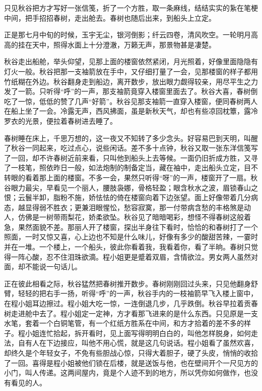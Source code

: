\documentclass[12pt,UTF8]{ctexbook}
\begin{document}
{{{只见秋谷把方才写好一张信笺，折了一个方胜，取一条麻线，结结实实的紥在笔梗中间，把手招招春树，走出舱去。春树也随后出来，到船头上立定。

正是那七月中旬的时候，玉宇无尘，银河倒影；纤云四卷，清风吹空。一轮明月高高的挂在天中，照得水面上十分澄澈，万籁无声，那景物甚是凄楚。

秋谷走出船舱，举头仰望，见那上面的楼窗依然紧闭，月光照着，好像里面隐隐有灯火一般。秋谷把那一支袖箭放在手中，又仔细打量了一会，见那楼窗的样子都用竹纸糊在外边。秋谷翻身走到船边，离开数步，放出眼力觑得较亲，用尽平生之力发了一箭。只听得“呼”的一声，那支袖箭竟穿入楼窗里面去了。秋谷大喜，春树倒吃了一惊，低低的赞了几声“好箭”。秋谷见那支袖箭一直穿入楼窗，便同春树两人在船上坐了一会。冷露无声，西风拂面，虽是新秋天气，却也有些凉回枕簟，露冷罗衣的光景，便拉着春树进去睡了。

春树睡在床上，千思万想的，这一夜又不知转了多少念头。好容易巴到天明，叫醒了秋谷一同起来，吃过点心，说些闲话。差不多十点钟，秋谷又取一张东洋信笺写了一回，却不许春树近前来看，只叫他到船头上去等候。一面仍旧折成方胜，又寻了一枝笔，照依昨日一般，如法炮制的制备定当，藏在袖中，走出船头立定，目不转眼的看着那上面的楼窗。不多一会，果然只听得“呀”的一声，楼窗开了一扇。秋谷眼力最尖，早看见一个丽人，腰肢袅娜，骨格轻盈；眼含秋水之波，眉锁春山之恨；云鬟半卸，脂粉不施，娇怯怯的倚在楼窗向着下边张望。面上好像带着几分病态，越显得弱不胜衣；更兼泪眼惺忪，愁容寂寞，那一付带病含愁的丰格煞是动人，仿佛是一树带雨梨花，娇柔欲坠。秋谷见了暗暗喝彩，想怪不得春树这般着急，果然面貌不差。那丽人开了楼窗，探出半身往下看时，恰恰的和春树打了一个照面，一时又惊又喜，心上边也不知是什么味儿，好像有多少的酸甜苦辣，一霎时并在一堆。一个楼上，一个船头，彼此你看着我，我看着你，看了半晌。春树只觉得一阵心酸，忍不住泪珠欲滴。程小姐更是蹙着双眉，含情欲泣。男女两人虽然对面，却不能说一句话儿。

正在彼此相看之际，秋谷猛然把春树推开数步。春树刚刚回过头来，只见他翻身舒臂，轻轻的把右手一扬，听得“呼”的一声，秋谷手内的一枝袖箭早飞入楼上窗中，在程小姐耳边擦过。程小姐大吃一惊，一连倒退几步，几乎跌倒。秋谷早拉着贡春树走进舱中去了。程小姐定一定神，方才看那飞进来的是什么东西。只见原是一支水笔，套着一个白铜笔管，有一个红纸方胜系在中间，和方才拾着的差不多的样子。程小姐连忙拾起，拆开看时，见上面写得明明白白的，叫他怎样脱身，如何走法，自有人在下边接应，叫他不用心慌，就是这几句说话。程小姐看了虽然欢喜，却终久是个年轻女子，不免有些胆战心惊，只得大着胆子，硬了头皮，悄悄的收拾了一回。喜得是程小姐被他们锁在后楼，就是送饭与他，也在壁间开个一尺见方的小门，叫人传递。这两间屋内，竟是个人迹不到的地方，所以凭你如何做作，也没有看见的人。

}}}
\end{document}
